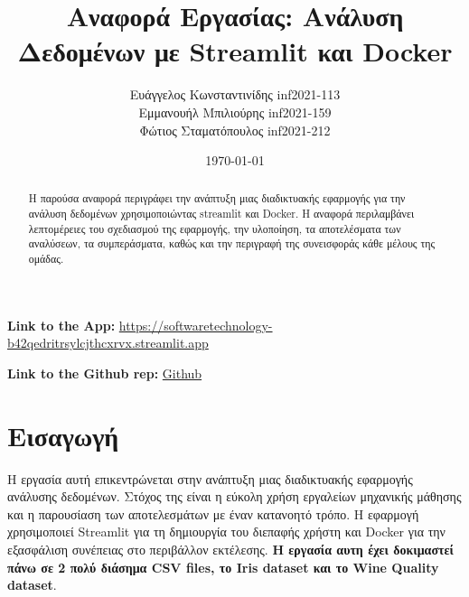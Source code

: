 \documentclass[a4paper,12pt]{article}
\title{Αναφορά Εργασίας: Ανάλυση Δεδομένων με \textlatin{Streamlit} και \textlatin{Docker}}
\author{Ευάγγελος Κωνσταντινίδης \textlatin{inf2021-113} \\
        Εμμανουήλ Μπιλιούρης \textlatin{inf2021-159} \\
        Φώτιος Σταματόπουλος \textlatin{inf2021-212}}
\date{\today}
\begin{document}

\maketitle

\begin{center}
    \textbf{\textlatin{Link to the App}:} \href{https://softwaretechnology-b42qedritrsylcjthcxrvx.streamlit.app}{\textlatin{https://softwaretechnology-b42qedritrsylcjthcxrvx.streamlit.app}}
\end{center}

\begin{center}
    \textbf{\textlatin{Link to the Github rep}:} \href{https://github.com/ManosBiliouris/Texnologia_Logismikou/tree/master}{\textlatin{Github}}
\end{center}

\begin{abstract}
Η παρούσα αναφορά περιγράφει την ανάπτυξη μιας διαδικτυακής εφαρμογής για την ανάλυση δεδομένων χρησιμοποιώντας \textlatin{streamlit} και \textlatin{Docker}. Η αναφορά περιλαμβάνει λεπτομέρειες του σχεδιασμού της εφαρμογής, την υλοποίηση, τα αποτελέσματα των αναλύσεων, τα συμπεράσματα, καθώς και την περιγραφή της συνεισφοράς κάθε μέλους της ομάδας.
\end{abstract}

\tableofcontents
\newpage

\section{Εισαγωγή}
\label{sec:intro}
Η εργασία αυτή επικεντρώνεται στην ανάπτυξη μιας διαδικτυακής εφαρμογής ανάλυσης δεδομένων. Στόχος της είναι η εύκολη χρήση εργαλείων μηχανικής μάθησης και η παρουσίαση των αποτελεσμάτων με έναν κατανοητό τρόπο. Η εφαρμογή χρησιμοποιεί \textlatin{Streamlit} για τη δημιουργία του διεπαφής χρήστη και \textlatin{Docker} για την εξασφάλιση συνέπειας στο περιβάλλον εκτέλεσης. \textbf{Η εργασία αυτη έχει δοκιμαστεί πάνω σε 2 πολύ διάσημα \textlatin{CSV files}, το \textlatin{Iris dataset} και το \textlatin{Wine Quality dataset}}.
\end{document}
